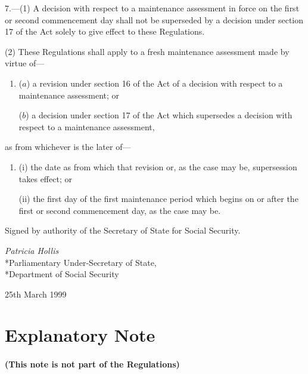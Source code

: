 \documentclass[12pt,a4paper]{article}
\begin{document}
7.—(1) A decision with respect to a maintenance assessment in force on the first or second commencement day shall not be superseded by a decision under section 17 of the Act solely to give effect to these Regulations.

(2) These Regulations shall apply to a fresh maintenance assessment made by virtue of—
\begin{enumerate}\item[]
($a$) a revision under section 16 of the Act of a decision with respect to a maintenance assessment; or

($b$) a decision under section 17 of the Act which supersedes a decision with respect to a maintenance assessment,
\end{enumerate}
as from whichever is the later of—
\begin{enumerate}\item[]
(i) the date as from which that revision or, as the case may be, supersession takes effect; or

(ii) the first day of the first maintenance period which begins on or after the first or second commencement day, as the case may be.
\end{enumerate}


\bigskip

Signed 
by authority of the Secretary of State for Social Security.

{\raggedleft
\emph{Patricia Hollis}\\*Parliamentary Under-Secretary of State,\\*Department of Social Security

}

25th March 1999

\small

\part{Explanatory Note}

\renewcommand\parthead{--- Explanatory Note}

\subsection*{(This note is not part of the Regulations)}
\end{document}
